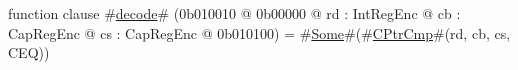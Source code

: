 function clause #\hyperref[sailMIPSzdecode]{decode}# (0b010010 @ 0b00000 @ rd : IntRegEnc @ cb : CapRegEnc @ cs : CapRegEnc @ 0b010100) = #\hyperref[sailMIPSzSome]{Some}#(#\hyperref[sailMIPSzCPtrCmp]{CPtrCmp}#(rd, cb, cs, CEQ))
